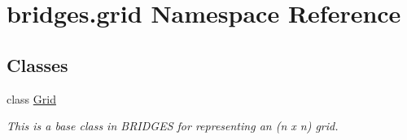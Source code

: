 \hypertarget{namespacebridges_1_1grid}{}\section{bridges.\+grid Namespace Reference}
\label{namespacebridges_1_1grid}
\subsection*{Classes}
\begin{DoxyCompactItemize}
\item 
class \hyperlink{classbridges_1_1grid_1_1_grid}{Grid}
\begin{DoxyCompactList}\small\item\em This is a base class in B\+R\+I\+D\+G\+ES for representing an (n x n) grid. \end{DoxyCompactList}\end{DoxyCompactItemize}
